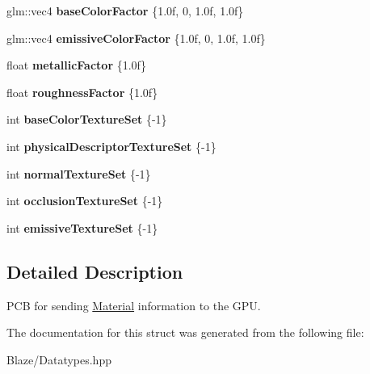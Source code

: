 \begin{DoxyCompactItemize}
\item 
\mbox{\label{structblaze_1_1MaterialPushConstantBlock_afdd145ef6c813ea739ec6fcd46e66e50}} 
glm\+::vec4 {\bfseries base\+Color\+Factor} \{1.\+0f, 0, 1.\+0f, 1.\+0f\}
\item 
\mbox{\label{structblaze_1_1MaterialPushConstantBlock_a9bac83eacdec66f73d38a9515cedb88a}} 
glm\+::vec4 {\bfseries emissive\+Color\+Factor} \{1.\+0f, 0, 1.\+0f, 1.\+0f\}
\item 
\mbox{\label{structblaze_1_1MaterialPushConstantBlock_a68cd0b40dec941e070e171bce1ade9f5}} 
float {\bfseries metallic\+Factor} \{1.\+0f\}
\item 
\mbox{\label{structblaze_1_1MaterialPushConstantBlock_aa42b34364281afabf0d51c7da2f69db1}} 
float {\bfseries roughness\+Factor} \{1.\+0f\}
\item 
\mbox{\label{structblaze_1_1MaterialPushConstantBlock_a8d4063f81109c6ec172127b41be4b63d}} 
int {\bfseries base\+Color\+Texture\+Set} \{-\/1\}
\item 
\mbox{\label{structblaze_1_1MaterialPushConstantBlock_a38953dc87844f2b8f6c12fea216ed7d8}} 
int {\bfseries physical\+Descriptor\+Texture\+Set} \{-\/1\}
\item 
\mbox{\label{structblaze_1_1MaterialPushConstantBlock_a388d2a50796781c042ab9a9ac0160a38}} 
int {\bfseries normal\+Texture\+Set} \{-\/1\}
\item 
\mbox{\label{structblaze_1_1MaterialPushConstantBlock_ab3c25ba5d6538764c93f0583317d6214}} 
int {\bfseries occlusion\+Texture\+Set} \{-\/1\}
\item 
\mbox{\label{structblaze_1_1MaterialPushConstantBlock_a217a236916890c8d9c9562bd9bd6bd84}} 
int {\bfseries emissive\+Texture\+Set} \{-\/1\}
\end{DoxyCompactItemize}


\subsection{Detailed Description}
P\+CB for sending \hyperlink{classblaze_1_1Material}{Material} information to the G\+PU. 

The documentation for this struct was generated from the following file\+:\begin{DoxyCompactItemize}
\item 
Blaze/Datatypes.\+hpp\end{DoxyCompactItemize}
